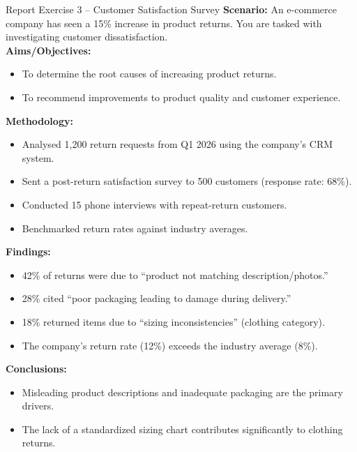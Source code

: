 \documentclass[12pt,a4paper]{article}
\begin{document}
\begin{exbox}{Report Exercise 3 -- Customer Satisfaction Survey}
\textbf{Scenario:} An e-commerce company has seen a 15\% increase in product returns. You are tasked with investigating customer dissatisfaction.\\[0.3cm]

\textbf{Aims/Objectives:}
\begin{itemize}[noitemsep]
    \item To determine the root causes of increasing product returns.
    \item To recommend improvements to product quality and customer experience.
\end{itemize}

\textbf{Methodology:}
\begin{itemize}[noitemsep]
    \item Analysed 1,200 return requests from Q1 2026 using the company's CRM system.
    \item Sent a post-return satisfaction survey to 500 customers (response rate: 68\%).
    \item Conducted 15 phone interviews with repeat-return customers.
    \item Benchmarked return rates against industry averages.
\end{itemize}

\textbf{Findings:}
\begin{itemize}[noitemsep]
    \item 42\% of returns were due to ``product not matching description/photos.''
    \item 28\% cited ``poor packaging leading to damage during delivery.''
    \item 18\% returned items due to ``sizing inconsistencies'' (clothing category).
    \item The company's return rate (12\%) exceeds the industry average (8\%).
\end{itemize}

\textbf{Conclusions:}
\begin{itemize}[noitemsep]
    \item Misleading product descriptions and inadequate packaging are the primary drivers.
    \item The lack of a standardized sizing chart contributes significantly to clothing returns.
\end{itemize}


\end{exbox}
\end{document}
